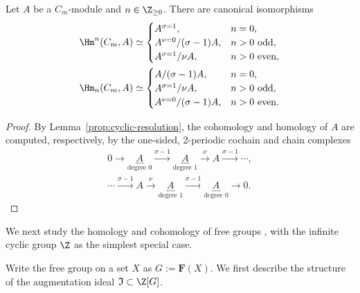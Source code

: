 \begin{proposition}\label{prop:group-cohomology-cyclic}
	Let $A$ be a $C_m$-module and $n\in\Z_{\geq0}$. There are canonical
	isomorphisms
	\begin{align*}
		\Hm^n(C_m,A)&\simeq
		\begin{cases}
			A^{\sigma=1},&n=0,\\
			A^{\nu=0}/(\sigma-1)A,&n>0\ \text{odd},\\
			A^{\sigma=1}/\nu A,&n>0\ \text{even},
		\end{cases}\\
		\Hm_n(C_m,A)&\simeq
		\begin{cases}
			A/(\sigma-1)A,&n=0,\\
			A^{\sigma=1}/\nu A,&n>0\ \text{odd},\\
			A^{\nu=0}/(\sigma-1)A,&n>0\ \text{even}.
		\end{cases}
	\end{align*}
\end{proposition}
\begin{proof}
	By Lemma~\ref{prop:cyclic-resolution}, the cohomology and homology of $A$
	are computed, respectively, by the one-sided, 2-periodic cochain and chain
	complexes
	\begin{gather*}
		0\to\underbracket{A}_{\text{degree }0}
		\xrightarrow{\sigma-1}\underbracket{A}_{\text{degree }1}
		\xrightarrow{\nu}A\xrightarrow{\sigma-1}\cdots,\\
		\cdots\xrightarrow{\sigma-1}A\xrightarrow{\nu}
		\underbracket{A}_{\text{degree }1}\xrightarrow{\sigma-1}
		\underbracket{A}_{\text{degree }0}\to0.
	\end{gather*}
\end{proof}

We next study the homology and cohomology of free groups
\cite[Definition 4.8.2]{Li1}, with the infinite cyclic group $\Z$ as the
simplest special case.

Write the free group on a set $X$ as $G:=\mathbf{F}(X)$. We first describe
the structure of the augmentation ideal $\mathfrak{I}\subset\Z[G]$.

